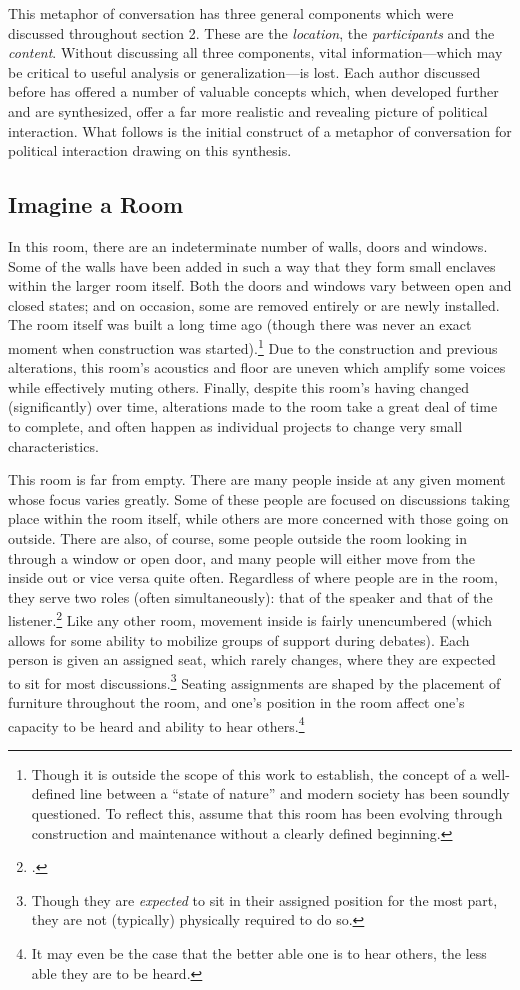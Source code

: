 \documentclass[openany,twoside]{memoir}
\begin{document}
\begin{Spacing}{2}
This metaphor of conversation has three general components which were discussed throughout section 2.
These are the \emph{location}, the \emph{participants} and the \emph{content}.
Without discussing all three components, vital information---which may be critical to useful analysis or generalization---is lost.
Each author discussed before has offered a number of valuable concepts which, when developed further and are synthesized, offer a far more realistic and revealing picture of political interaction.
What follows is the initial construct of a metaphor of conversation for political interaction drawing on this synthesis.

\subsection{Imagine a Room}
In this room, there are an indeterminate number of walls, doors and windows.
Some of the walls have been added in such a way that they form small enclaves within the larger room itself.
Both the doors and windows vary between open and closed states; and on occasion, some are removed entirely or are newly installed.
The room itself was built a long time ago (though there was never an exact moment when construction was started).\footnote{
Though it is outside the scope of this work to establish, the concept of a well-defined line between a ``state of nature'' and modern society has been soundly questioned. 
To reflect this, assume that this room has been evolving through construction and maintenance without a clearly defined beginning.}
Due to the construction and previous alterations, this room's acoustics and floor are uneven which amplify some voices while effectively muting others. 
Finally, despite this room's having changed (significantly) over time, alterations made to the room take a great deal of time to complete, and often happen as individual projects to change very small characteristics.

This room is far from empty. 
There are many people inside at any given moment whose focus varies greatly.
Some of these people are focused on discussions taking place within the room itself, while others are more concerned with those going on outside.
There are also, of course, some people outside the room looking in through a window or open door, and many people will either move from the inside out or vice versa quite often.
Regardless of where people are in the room, they serve two roles (often simultaneously): that of the speaker and that of the listener.\footcite[4]{bickford96}
Like any other room, movement inside is fairly unencumbered (which allows for some ability to mobilize groups of support during debates). 
Each person is given an assigned seat, which rarely changes, where they are expected to sit for most discussions.\footnote{
Though they are \emph{expected} to sit in their assigned position for the most part, they are not (typically) physically required to do so.}
Seating assignments are shaped by the placement of furniture throughout the room, and one's position in the room affect one's capacity to be heard and ability to hear others.\footnote{
It may even be the case that the better able one is to hear others, the less able they are to be heard.}


\end{Spacing}
\end{document}
